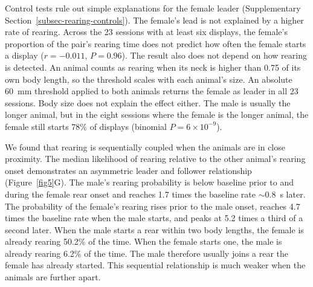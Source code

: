 \documentclass[pdflatex, sn-nature]{sn-jnl}
\theoremstyle{thmstyleone}%
\theoremstyle{thmstyletwo}%
\theoremstyle{thmstylethree}%
\begin{document}
Control tests rule out simple explanations for the female leader (Supplementary Section~\ref{subsec-rearing-controls}). The female's lead is not explained by a higher rate of rearing. Across the 23 sessions with at least six displays, the female's proportion of the pair's rearing time does not predict how often the female starts a display ($r = -0.011$, $P = 0.96$). The result also does not depend on how rearing is detected. An animal counts as rearing when its neck is higher than 0.75 of its own body length, so the threshold scales with each animal's size. An absolute 60~mm threshold applied to both animals returns the female as leader in all 23 sessions. Body size does not explain the effect either. The male is usually the longer animal, but in the eight sessions where the female is the longer animal, the female still starts 78\% of displays (binomial $P = 6 \times 10^{-9}$).

We found that rearing is sequentially coupled when the animals are in close proximity. The median likelihood of rearing relative to the other animal's rearing onset demonstrates an asymmetric leader and follower relationship (Figure~\ref{fig5}G). The male's rearing probability is below baseline prior to and during the female rear onset and reaches 1.7 times the baseline rate $\sim$0.8~s later. The probability of the female's rearing rises prior to the male onset, reaches 4.7 times the baseline rate when the male starts, and peaks at 5.2 times a third of a second later. When the male starts a rear within two body lengths, the female is already rearing 50.2\% of the time. When the female starts one, the male is already rearing 6.2\% of the time. The male therefore usually joins a rear the female has already started. This sequential relationship is much weaker when the animals are further apart.
\end{document}

